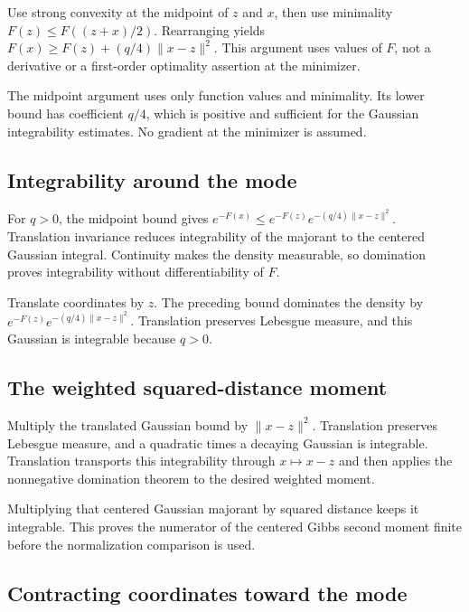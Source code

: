 \documentclass[11pt,a4paper]{report}
\begin{document}
Use strong convexity at the midpoint of \(z\) and \(x\), then use minimality \(F(z)\le F((z+x)/2)\). Rearranging yields \(F(x)\ge F(z)+(q/4)\|x-z\|^2\). This argument uses values of \(F\), not a derivative or a first-order optimality assertion at the minimizer.



The midpoint argument uses only function values and minimality. Its lower bound has coefficient \(q/4\), which is positive and sufficient for the Gaussian integrability estimates. No gradient at the minimizer is assumed.

\subsection{\texorpdfstring{Integrability around the mode}{Integrability around the mode}}
\label{report-step-UnadjustedLangevin-GibbsConcentration-lean-2}


For \(q>0\), the midpoint bound gives \(e^{-F(x)}\le e^{-F(z)}e^{-(q/4)\|x-z\|^2}\). Translation invariance reduces integrability of the majorant to the centered Gaussian integral. Continuity makes the density measurable, so domination proves integrability without differentiability of \(F\).



Translate coordinates by \(z\). The preceding bound dominates the density by \(e^{-F(z)}e^{-(q/4)\|x-z\|^2}\). Translation preserves Lebesgue measure, and this Gaussian is integrable because \(q>0\).

\subsection{\texorpdfstring{The weighted squared-distance moment}{The weighted squared-distance moment}}
\label{report-step-UnadjustedLangevin-GibbsConcentration-lean-3}


Multiply the translated Gaussian bound by \(\|x-z\|^2\). Translation preserves Lebesgue measure, and a quadratic times a decaying Gaussian is integrable. Translation transports this integrability through \(x\mapsto x-z\) and then applies the nonnegative domination theorem to the desired weighted moment.



Multiplying that centered Gaussian majorant by squared distance keeps it integrable. This proves the numerator of the centered Gibbs second moment finite before the normalization comparison is used.

\subsection{\texorpdfstring{Contracting coordinates toward the mode}{Contracting coordinates toward the mode}}
\label{report-step-UnadjustedLangevin-GibbsConcentration-lean-4}
\end{document}
